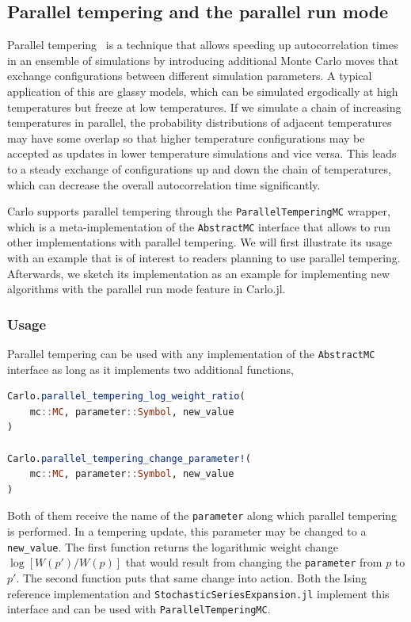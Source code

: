 \documentclass{SciPost}
\begin{document}
\subsection{Parallel tempering and the parallel run mode}
\label{sec:parallel_tempering}
Parallel tempering~\cite{Earl2005} is a technique that allows speeding up autocorrelation times in an ensemble of simulations by introducing additional Monte Carlo moves that exchange configurations between different simulation parameters. A typical application of this are glassy models, which can be simulated ergodically at high temperatures but freeze at low temperatures. If we simulate a chain of increasing temperatures in parallel, the probability distributions of adjacent temperatures may have some overlap so that higher temperature configurations may be accepted as updates in lower temperature simulations and vice versa. This leads to a steady exchange of configurations up and down the chain of temperatures, which can decrease the overall autocorrelation time significantly.

Carlo supports parallel tempering through the \texttt{ParallelTemperingMC} wrapper, which is a meta-implementation of the \texttt{AbstractMC} interface that allows to run other implementations with parallel tempering. We will first illustrate its usage with an example that is of interest to readers planning to use parallel tempering. Afterwards, we sketch its implementation as an example for implementing new algorithms with the parallel run mode feature in Carlo.jl.
\subsubsection{Usage}
Parallel tempering can be used with any implementation of the \texttt{AbstractMC} interface as long as it implements two additional functions,
\begin{lstlisting}[language=julia]
Carlo.parallel_tempering_log_weight_ratio(
    mc::MC, parameter::Symbol, new_value
)

Carlo.parallel_tempering_change_parameter!(
    mc::MC, parameter::Symbol, new_value
)
\end{lstlisting}
Both of them receive the name of the \texttt{parameter} along which parallel tempering is performed. In a tempering update, this parameter may be changed to a \texttt{new\_{}value}. The first function returns the logarithmic weight change $\log[W(p')/W(p)]$ that would result from changing the \texttt{parameter} from $p$ to $p'$. The second function puts that same change into action. Both the Ising reference implementation and \texttt{StochasticSeriesExpansion.jl} implement this interface and can be used with \texttt{ParallelTemperingMC}.
\end{document}
